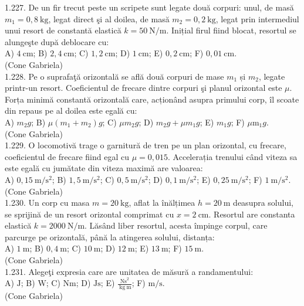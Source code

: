 1.227. De un fir trecut peste un scripete sunt legate două corpuri: unul, de masă $m_{1}=0,8 \mathrm{~kg}$, legat direct şi al doilea, de masă $m_{2}=0,2 \mathrm{~kg}$, legat prin intermediul unui resort de constantă elastică $k=50 \mathrm{~N} / \mathrm{m}$. Inițial firul fiind blocat, resortul se alungeşte după deblocare cu:\\ A) $4 \mathrm{~cm}$; B) $2,4 \mathrm{~cm}$; C) $1,2 \mathrm{~cm}$; D) $1 \mathrm{~cm}$; E) $0,2 \mathrm{~cm}$; F) $0,01 \mathrm{~cm}$.\\ (Cone Gabriela)\\

1.228. Pe o suprafaţă orizontală se află două corpuri de mase $m_{1}$ și $m_{2}$, legate printr-un resort. Coeficientul de frecare dintre corpuri şi planul orizontal este $\mu$. Forța minimă constantă orizontală care, acționând asupra primului corp, îl scoate din repaus pe al doilea este egală cu:\\ A) $m_{2} g$; B) $\mu\left(m_{1}+m_{2}\right) g$; C) $\mu m_{2} g$; D) $m_{2} g+\mu m_{1} g$; E) $m_{1} g$; F) $\mu \mathrm{m}_{1} g$.\\ (Cone Gabriela)\\

1.229. O locomotivă trage o garnitură de tren pe un plan orizontal, cu frecare, coeficientul de frecare fiind egal cu $\mu=0,015$. Accelerația trenului când viteza sa este egală cu jumătate din viteza maximă are valoarea:\\ A) $0,15 \mathrm{~m} / \mathrm{s}^{2}$; B) $1,5 \mathrm{~m} / \mathrm{s}^{2}$; C) $0,5 \mathrm{~m} / \mathrm{s}^{2}$; D) $0,1 \mathrm{~m} / \mathrm{s}^{2}$; E) $0,25 \mathrm{~m} / \mathrm{s}^{2}$; F) $1 \mathrm{~m} / \mathrm{s}^{2}$.\\ (Cone Gabriela)\\

1.230. Un corp cu masa $m=20 \mathrm{~kg}$, aflat la înălțimea $h=20 \mathrm{~m}$ deasupra solului, se sprijină de un resort orizontal comprimat cu $x=2 \mathrm{~cm}$. Resortul are constanta elastică $k=2000 \mathrm{~N} / \mathrm{m}$. Lăsând liber resortul, acesta împinge corpul, care parcurge pe orizontală, până la atingerea solului, distanța:\\ A) $1 \mathrm{~m}$; B) $0,4 \mathrm{~m}$; C) $10 \mathrm{~m}$; D) $12 \mathrm{~m}$; E) $13 \mathrm{~m}$; F) $15 \mathrm{~m}$.\\ (Cone Gabriela)\\

1.231. Alegeţi expresia care are unitatea de măsură a randamentului:\\ A) $\mathrm{J}$; B) $\mathrm{W}$; C) $\mathrm{Nm}$; D) $\mathrm{Js}$; E) $\frac{\mathrm{Ns}^{2}}{\mathrm{~kg} \mathrm{~m}}$; F) $\mathrm{m} / \mathrm{s}$.\\ (Cone Gabriela)\\

